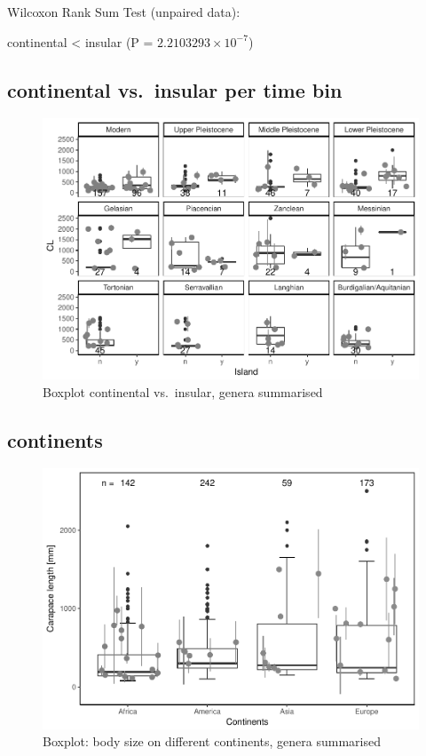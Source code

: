 \documentclass[]{article}
\begin{document}
Wilcoxon Rank Sum Test (unpaired data):

continental \textless{} insular (P = \(2.2103293\times 10^{-7}\))

\newpage

\subsection{continental vs.~insular per time
bin}\label{continental-vs.insular-per-time-bin-1}

\begin{figure}[htbp]
\centering
\includegraphics{MA_JJ_files/figure-latex/BPCIBins-1.pdf}
\caption{Boxplot continental vs.~insular, genera summarised}
\end{figure}

\newpage

\subsection{continents}\label{continents-1}

\begin{figure}[htbp]
\centering
\includegraphics{MA_JJ_files/figure-latex/BPCon-1.pdf}
\caption{Boxplot: body size on different continents, genera summarised}
\end{figure}
\end{document}
